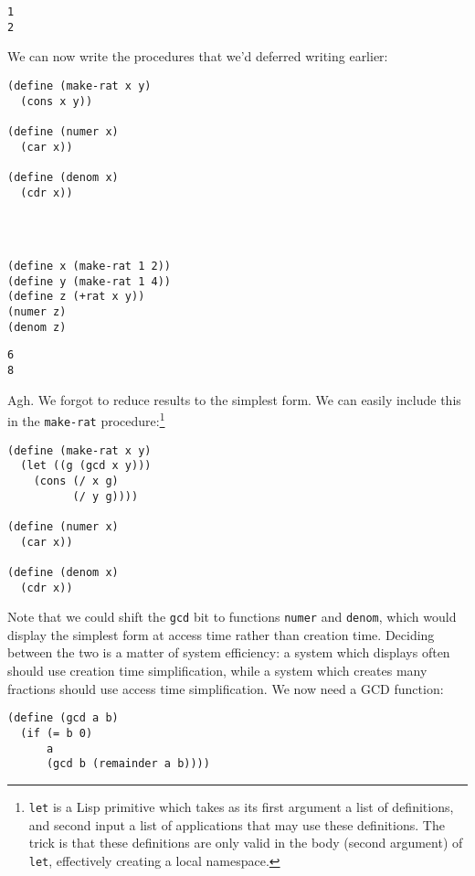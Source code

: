 \documentclass[9pt]{report}
\begin{document}
\begin{verbatim}
1
2
\end{verbatim}


We can now write the procedures that we'd deferred writing
earlier:

\begin{verbatim}
(define (make-rat x y)
  (cons x y))

(define (numer x)
  (car x))

(define (denom x)
  (cdr x))
\end{verbatim}

\begin{verbatim}



(define x (make-rat 1 2))
(define y (make-rat 1 4))
(define z (+rat x y))
(numer z)
(denom z)
\end{verbatim}

\begin{verbatim}
6
8
\end{verbatim}


Agh. We forgot to reduce results to the simplest form. We can
easily include this in the \texttt{make-rat} procedure:\footnote{\texttt{let} is a Lisp primitive which takes as its first argument a
list of definitions, and second input a list of applications that may
use these definitions. The trick is that these definitions are only
valid in the body (second argument) of \texttt{let}, effectively creating a
local namespace.}

\begin{verbatim}
(define (make-rat x y)
  (let ((g (gcd x y)))
    (cons (/ x g)
          (/ y g))))

(define (numer x)
  (car x))

(define (denom x)
  (cdr x))
\end{verbatim}

Note that we could shift the \texttt{gcd} bit to functions \texttt{numer} and
\texttt{denom}, which would display the simplest form at access time
rather than creation time. Deciding between the two is a matter of
system efficiency: a system which displays often should use
creation time simplification, while a system which creates many
fractions should use access time simplification.
We now need a GCD function:

\begin{verbatim}
(define (gcd a b)
  (if (= b 0)
      a
      (gcd b (remainder a b))))
\end{verbatim}
\end{document}
